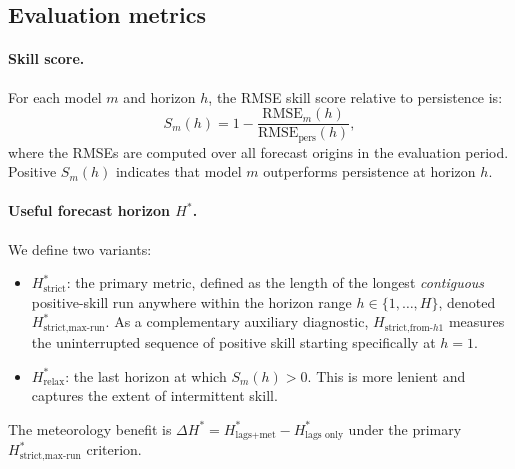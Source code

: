 \documentclass[12pt,a4paper]{article}
\begin{document}
\subsection{Evaluation metrics}

\paragraph{Skill score.}
For each model $m$ and horizon $h$, the RMSE skill score relative to
persistence is:
\begin{equation}
  S_m(h) = 1 - \frac{\mathrm{RMSE}_m(h)}{\mathrm{RMSE}_{\text{pers}}(h)},
  \label{eq:skill}
\end{equation}
where the RMSEs are computed over all forecast origins in the evaluation period.
Positive $S_m(h)$ indicates that model $m$ outperforms persistence at horizon
$h$.

\paragraph{Useful forecast horizon $H^*$.}
We define two variants:
\begin{itemize}
  \item \textbf{$H^*_{\text{strict}}$}: the primary metric, defined as the length of the longest \emph{contiguous} positive-skill run anywhere within the horizon range $h \in \{1, \dots, H\}$, denoted $H^*_{\text{strict,max-run}}$. As a complementary auxiliary diagnostic, $H_{\text{strict,from-}h1}$ measures the uninterrupted sequence of positive skill starting specifically at $h = 1$.
  \item \textbf{$H^*_{\text{relax}}$}: the last horizon at which $S_m(h) > 0$.  This is more lenient and captures the extent of intermittent skill.
\end{itemize}
The meteorology benefit is $\Delta H^* = H^*_{\text{lags+met}} - H^*_{\text{lags only}}$ under the primary $H^*_{\text{strict,max-run}}$ criterion.
\end{document}

